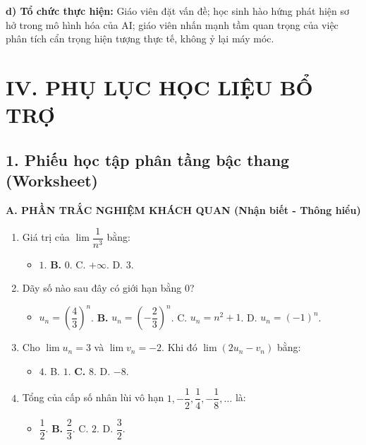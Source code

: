 \documentclass[12pt, a4paper]{article}
\begin{document}
\noindent \textbf{d) Tổ chức thực hiện:}
Giáo viên đặt vấn đề; học sinh hào hứng phát hiện sơ hở trong mô hình hóa của AI; giáo viên nhấn mạnh tầm quan trọng của việc phân tích cẩn trọng hiện tượng thực tế, không ỷ lại máy móc.

\section*{IV. PHỤ LỤC HỌC LIỆU BỔ TRỢ}

\subsection*{1. Phiếu học tập phân tầng bậc thang (Worksheet)}

\noindent \textbf{A. PHẦN TRẮC NGHIỆM KHÁCH QUAN (Nhận biết - Thông hiểu)}
\begin{enumerate}[leftmargin=0.6cm]
    \item Giá trị của $\lim \dfrac{1}{n^3}$ bằng:
    \begin{itemize}[leftmargin=0.6cm]
        \item[A.] $1$. \quad \textbf{B.} $0$. \quad C. $+\infty$. \quad D. $3$.
    \end{itemize}
    \item Dãy số nào sau đây có giới hạn bằng $0$?
    \begin{itemize}[leftmargin=0.6cm]
        \item[A.] $u_n = \left(\dfrac{4}{3}\right)^n$. \quad \textbf{B.} $u_n = \left(-\dfrac{2}{3}\right)^n$. \quad C. $u_n = n^2 + 1$. \quad D. $u_n = (-1)^n$.
    \end{itemize}
    \item Cho $\lim u_n = 3$ và $\lim v_n = -2$. Khi đó $\lim (2u_n - v_n)$ bằng:
    \begin{itemize}[leftmargin=0.6cm]
        \item[A.] $4$. \quad B. $1$. \quad \textbf{C.} $8$. \quad D. $-8$.
    \end{itemize}
    \item Tổng của cấp số nhân lùi vô hạn $1, -\dfrac{1}{2}, \dfrac{1}{4}, -\dfrac{1}{8}, \dots$ là:
    \begin{itemize}[leftmargin=0.6cm]
        \item[A.] $\dfrac{1}{2}$. \quad \textbf{B.} $\dfrac{2}{3}$. \quad C. $2$. \quad D. $\dfrac{3}{2}$.
    \end{itemize}
\end{enumerate}
\end{document}
